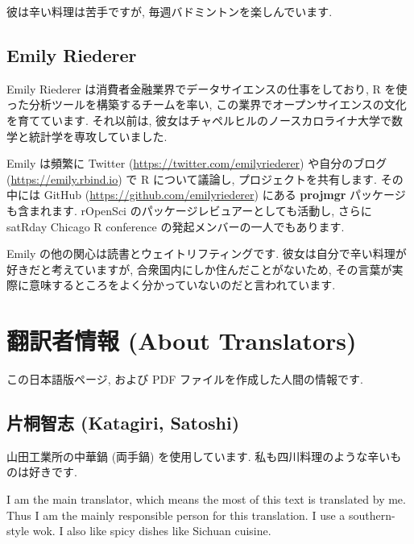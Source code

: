 \documentclass[
  11pt,
  lualatex,
  ja=standard]{bxjsreport}
\begin{document}
彼は辛い料理は苦手ですが, 毎週バドミントンを楽しんでいます.

\hypertarget{emily-riederer}{%
\section*{Emily Riederer}\label{emily-riederer}}

Emily Riederer は消費者金融業界でデータサイエンスの仕事をしており, R を使った分析ツールを構築するチームを率い, この業界でオープンサイエンスの文化を育てています. それ以前は, 彼女はチャペルヒルのノースカロライナ大学で数学と統計学を専攻していました.

Emily は頻繁に Twitter (\url{https://twitter.com/emilyriederer}) や自分のブログ (\url{https://emily.rbind.io}) で R について議論し, プロジェクトを共有します. その中には GitHub (\url{https://github.com/emilyriederer}) にある \textbf{projmgr} パッケージも含まれます. rOpenSci のパッケージレビュアーとしても活動し, さらに satRday Chicago R conference の発起メンバーの一人でもあります.

Emily の他の関心は読書とウェイトリフティングです. 彼女は自分で辛い料理が好きだと考えていますが, 合衆国内にしか住んだことがないため, その言葉が実際に意味するところをよく分かっていないのだと言われています.

\hypertarget{translators}{%
\chapter*{翻訳者情報 (About Translators)}\label{translators}}

この日本語版ページ, および PDF ファイルを作成した人間の情報です.

\hypertarget{ux7247ux6850ux667aux5fd7-katagiri-satoshi}{%
\section*{片桐智志 (Katagiri, Satoshi)}\label{ux7247ux6850ux667aux5fd7-katagiri-satoshi}}

山田工業所の中華鍋 (両手鍋) を使用しています. 私も四川料理のような辛いものは好きです.

I am the main translator, which means the most of this text is translated by me. Thus I am the mainly responsible person for this translation. I use a southern-style wok. I also like spicy dishes like Sichuan cuisine.
\end{document}
